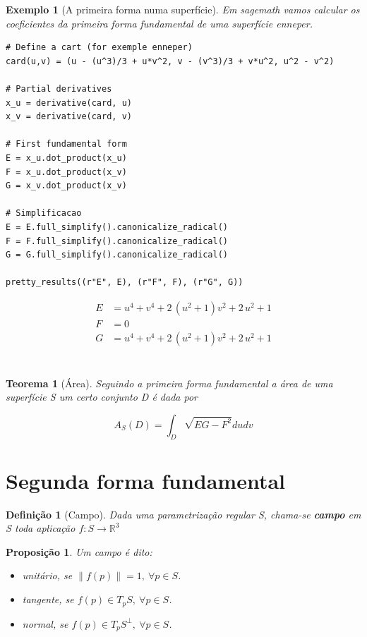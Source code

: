 \documentclass[12pt]{article}
\newtheorem{prop}{Proposição}
\newtheorem{ex}{Exemplo}[section]
\newtheorem{theorem}{Teorema}
\newtheorem{definition}{Definição}
\begin{document}
\begin{ex}[A primeira forma numa  superfície]
Em \textit{sagemath} vamos calcular os coeficientes da primeira forma fundamental de uma superfície enneper.

\begin{lstlisting}
# Define a cart (for exemple enneper)
card(u,v) = (u - (u^3)/3 + u*v^2, v - (v^3)/3 + v*u^2, u^2 - v^2)

# Partial derivatives
x_u = derivative(card, u)
x_v = derivative(card, v)

# First fundamental form
E = x_u.dot_product(x_u)
F = x_u.dot_product(x_v)
G = x_v.dot_product(x_v)

# Simplificacao
E = E.full_simplify().canonicalize_radical()
F = F.full_simplify().canonicalize_radical()
G = G.full_simplify().canonicalize_radical()

pretty_results((r"E", E), (r"F", F), (r"G", G))
\end{lstlisting}

\begin{align*} E &= u^{4} + v^{4} + 2 \, {\left(u^{2} + 1\right)} v^{2} + 2 \, u^{2} + 1 \\ F &= 0 \\ G &= u^{4} + v^{4} + 2 \, {\left(u^{2} + 1\right)} v^{2} + 2 \, u^{2} + 1 \\ \end{align*} \\
\end{ex}

\begin{theorem}[Área]
Seguindo a primeira forma fundamental a área de uma superfície S um certo conjunto D é dada por

\begin{equation*}
    A_S(D) = \int_D \sqrt{E G - F^2} d u d v
\end{equation*}
\end{theorem}

\section*{Segunda forma fundamental}
\label{s12}
\begin{definition}[Campo]
Dada uma parametrização regular S, chama-se \textbf{campo} em S toda aplicação $f: S \to \mathbb{R}^3$
\end{definition}

\begin{prop} Um campo é dito:
\begin{itemize}
    \item unitário, se $\| f(p) \| = 1,\ \forall p \in S$.
    
    \item tangente, se $f(p) \in T_p S,\ \forall p \in S$.
    
    \item normal, se $f(p) \in T_p S^\perp,\ \forall p \in S$.
\end{itemize}
\end{prop}
\end{document}
